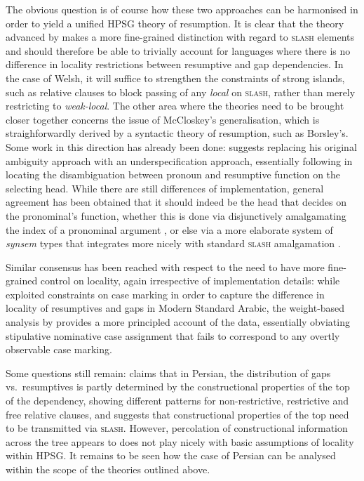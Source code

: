 \documentclass[output=paper
                ,modfonts
                ,nonflat
	        ,collection
	        ,collectionchapter
	        ,collectiontoclongg
 	        ,biblatex
                ,babelshorthands
                ,newtxmath
                ,draftmode
                ,colorlinks, citecolor=brown
]{./langsci/langscibook}
\begin{document}
{\begin{exe}
\end{exe}

The obvious question is of course how these two approaches can be harmonised in order to yield a unified HPSG theory of resumption.  It is clear that the theory advanced by \citet{Crysmann:12} makes a more fine-grained distinction with regard to \textsc{slash} elements and should therefore be able to trivially account for languages where there is no difference in locality restrictions between resumptive and gap dependencies. In the case of Welsh, it will suffice to strengthen the constraints of strong islands, such as relative clauses to block passing of any \textit{local} on \textsc{slash}, rather than merely restricting to \textit{weak-local}. The other area where the theories need to be brought closer together concerns the issue of McCloskey's generalisation, which is straighforwardly derived by a syntactic theory of resumption, such as Borsley's. Some work in this direction has already been done: \citet{Crysmann:16} suggests  replacing his original ambiguity approach with an underspecification approach, essentially following \citet{Borsley:10} in locating the disambiguation between pronoun and resumptive function on the selecting head. While there are still differences of implementation, general agreement has been obtained that it should indeed be the head that decides on the pronominal's function, whether this is done via disjunctively amalgamating the index of a pronominal argument  \citep{Borsley:10,Alotaibi:Borsley:13}, or else via a more elaborate system of \textit{synsem} types that integrates more nicely with standard \textsc{slash} amalgamation \citep{Crysmann:16}. 

Similar consensus has been reached with respect to the need to have more fine-grained control on locality, again irrespective of implementation details: while \citet{Alotaibi:Borsley:13} exploited constraints on case marking in order to capture the difference in locality of  resumptives and gaps in Modern Standard Arabic, the weight-based analysis by  \citet{Crysmann:17} provides a more principled account of the data, essentially obviating stipulative nominative case assignment that fails to correspond to any overtly observable case marking.  

Some questions still remain: \citet{taghvaipour:phd:05} claims that in
Persian, the distribution of gaps vs.\ resumptives is partly
determined by the constructional properties of the top of the
dependency, showing different patterns for non-restrictive,
restrictive and free relative clauses, and suggests that
constructional properties of the top need to be transmitted via
\textsc{slash}.  However, percolation of constructional information
across the tree appears to does not play nicely with basic assumptions
of locality within HPSG. It remains to be seen how the case of Persian
can be analysed within the scope of the theories outlined above. 

}
\end{document}
